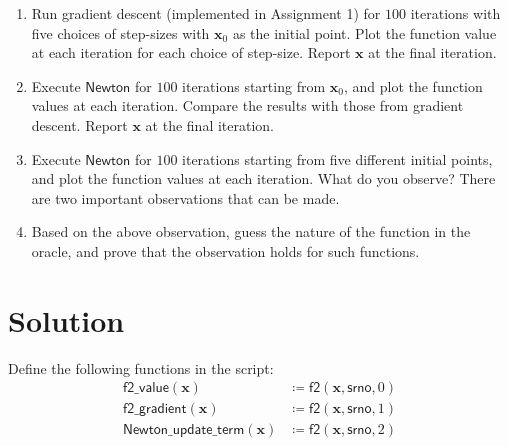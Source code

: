 \documentclass[12pt,a4paper]{article}
\theoremstyle{remark}
\begin{document}
\begin{enumerate}
    \item Run gradient descent (implemented in Assignment 1) for $100$ iterations with five choices of step-sizes with $\mathbf{x}_0$ as the initial point. Plot the function value at each iteration for each choice of step-size. Report $\mathbf{x}$ at the final iteration.
    \item Execute $\mathsf{Newton}$ for $100$ iterations starting from $\mathbf{x}_0$, and plot the function values at each iteration. Compare the results with those from gradient descent. Report $\mathbf{x}$ at the final iteration.
    \item Execute $\mathsf{Newton}$ for $100$ iterations starting from five different initial points, and plot the function values at each iteration. What do you observe? There are two important observations that can be made.
    \item Based on the above observation, guess the nature of the function in the oracle, and prove that the observation holds for such functions.
\end{enumerate}

\section*{Solution}

Define the following functions in the script:
\begin{align*}
    \mathsf{f2\_value}(\mathbf{x}) &\coloneqq \mathsf{f2}(\mathbf{x}, \mathsf{srno}, 0) \\
    \mathsf{f2\_gradient}(\mathbf{x}) &\coloneqq \mathsf{f2}(\mathbf{x}, \mathsf{srno}, 1) \\
    \mathsf{Newton\_update\_term}(\mathbf{x}) &\coloneqq \mathsf{f2}(\mathbf{x}, \mathsf{srno}, 2)
\end{align*}
\end{document}
